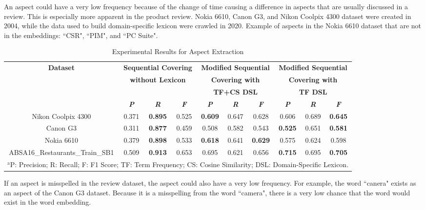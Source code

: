\documentclass[a4paper,conference]{IEEEtran}
\begin{document}
An aspect could have a very low frequency because of the change of time causing a difference in aspects that are usually discussed in a review. This is especially more apparent in the product review. Nokia 6610, Canon G3, and Nikon Coolpix 4300 dataset were created in 2004, while the data used to build domain-specific lexicon were crawled in 2020. Example of aspects in the Nokia 6610 dataset that are not in the embeddings: ``CSR", ``PIM", and ``PC Suite".

\begin{table}[htbp]
\caption{Experimental Results for Aspect Extraction}
\begin{center}
\begin{tabular}{|c|c|c|c|c|c|c|c|c|c|}
\hline
\textbf{Dataset}&\multicolumn{3}{|c|}{\textbf{Sequential Covering}}&\multicolumn{3}{|c|}{\textbf{Modified Sequential}}&\multicolumn{3}{|c|}{\textbf{Modified Sequential}}\\
&\multicolumn{3}{|c|}{\textbf{without Lexicon}}&\multicolumn{3}{|c|}{\textbf{Covering with}}&\multicolumn{3}{|c|}{\textbf{Covering with}}\\
&\multicolumn{3}{|c|}{}&\multicolumn{3}{|c|}{\textbf{TF+CS DSL}}&\multicolumn{3}{|c|}{\textbf{TF DSL}}\\
\cline{2-10} 
&\textbf{\textit{P}}& \textbf{\textit{R}}&\textbf{\textit{F}}&\textbf{\textit{P}}& \textbf{\textit{R}}&\textbf{\textit{F}}& \textbf{\textit{P}}& \textbf{\textit{R}}&\textbf{\textit{F}}\\
\hline
Nikon Coolpix 4300&0.371&\textbf{0.895}&0.525&\textbf{0.609}&0.647&0.628&0.606&0.689&\textbf{0.645} \\
\hline
Canon G3&0.311&\textbf{0.877}&0.459&0.508&0.582&0.543&\textbf{0.525}&0.651&\textbf{0.581}\\
\hline
Nokia 6610&0.379&\textbf{0.898}&0.533&\textbf{0.618}&0.641&\textbf{0.629}&0.575&0.624&0.598 \\
\hline
ABSA16\_Restaurants\_Train\_SB1&0.509&\textbf{0.913}&0.653&0.695&0.621&0.656&\textbf{0.715}&0.695&\textbf{0.705} \\
\hline
\multicolumn{10}{l}{$^{\mathrm{a}}$P: Precision; R: Recall; F: F1 Score; TF: Term Frequency; CS: Cosine Similarity; DSL: Domain-Specific Lexicon.}\\
\end{tabular}
\label{tab2}
\end{center}
\end{table}

If an aspect is misspelled in the review dataset, the aspect could also have a very low frequency. For example, the word ``canera" exists as an aspect of the Canon G3 dataset. Because it is a misspelling from the word ``camera", there is a very low chance that the word would exist in the word embedding.
\end{document}
